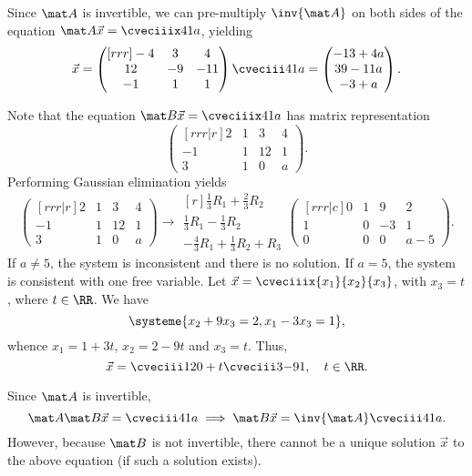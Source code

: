 \begin{solution}
    \begin{ppart}
        Since $\mat A$ is invertible, we can pre-multiply $\inv{\mat A}$ on both sides of the equation $\mat A \vec x = \cveciiix41a$, yielding \[\vec x = \begin{pmatrix}[rrr]-4 & 3 & 4 \\ 12 & -9 & -11 \\ -1 & 1 & 1\end{pmatrix} \cveciii41a = \begin{pmatrix}-13 + 4a \\ 39 - 11 a \\ -3 + a\end{pmatrix}.\]
    \end{ppart}
    \begin{ppart}
        Note that the equation $\mat B \vec x = \cveciiix41a$ has matrix representation \[\begin{pmatrix}[rrr|r]2 & 1 & 3 & 4 \\ -1 & 1 & 12 & 1 \\ 3 & 1 & 0 & a\end{pmatrix}.\] Performing Gaussian elimination yields \[\begin{pmatrix}[rrr|r]2 & 1 & 3 & 4 \\ -1 & 1 & 12 & 1 \\ 3 & 1 & 0 & a\end{pmatrix} \rightarrow \begin{matrix}[r]\scriptstyle\frac13 R_1 + \frac23 R_2 \\ \scriptstyle\frac13 R_1 - \frac13 R_2 \\ \scriptstyle-\frac43 R_1 + \frac13 R_2 + R_3\end{matrix} \begin{pmatrix}[rrr|c]0 & 1 & 9 & 2 \\ 1 & 0 & -3 & 1 \\ 0 & 0 & 0 & a-5\end{pmatrix}.\] If $a \neq 5$, the system is inconsistent and there is no solution. If $a = 5$, the system is consistent with one free variable. Let $\vec x = \cveciiix{x_1}{x_2}{x_3}$, with $x_3 = t$, where $t \in \RR$. We have \[\systeme{x_2 + 9x_3 = 2, x_1 - 3x_3 = 1},\] whence $x_1 = 1 + 3t$, $x_2 = 2-9t$ and $x_3 = t$. Thus, \[\vec x = \cveciii120 + t \cveciii3{-9}1, \quad t \in \RR.\]
    \end{ppart}

    Since $\mat A$ is invertible, \[\mat A \mat B \vec x = \cveciii41a \implies \mat B \vec x = \inv{\mat A}\cveciii41a.\] However, because $\mat B$ is not invertible, there cannot be a unique solution $\vec x$ to the above equation (if such a solution exists).
\end{solution}

